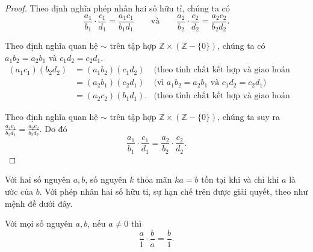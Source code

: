 \begin{proof}
	Theo định nghĩa phép nhân hai số hữu tỉ, chúng ta có
	\[
		\frac{a_{1}}{b_{1}}\cdot\frac{c_{1}}{d_{1}} = \frac{a_{1}c_{1}}{b_{1}d_{1}}\qquad\text{và}\qquad\frac{a_{2}}{b_{2}}\cdot\frac{c_{2}}{d_{2}} = \frac{a_{2}c_{2}}{b_{2}d_{2}}.
	\]

	Theo định nghĩa quan hệ $\sim$ trên tập hợp $\mathbb{Z}\times(\mathbb{Z} - \{0\})$, chúng ta có $a_{1}b_{2} = a_{2}b_{1}$ và $c_{1}d_{2} = c_{2}d_{1}$.
	\begin{align*}
		(a_{1}c_{1})(b_{2}d_{2}) & = (a_{1}b_{2})(c_{1}d_{2})  & \text{(theo tính chất kết hợp và giao hoán của phép nhân số nguyên)} \\
		                         & = (a_{2}b_{1})(c_{2}d_{1})  & \text{(vì $a_{1}b_{2} = a_{2}b_{1}$ và $c_{1}d_{2} = c_{2}d_{1}$)}   \\
		                         & = (a_{2}c_{2})(b_{1}d_{1}). & \text{(theo tính chất kết hợp và giao hoán của phép nhân số nguyên)}
	\end{align*}

	Theo định nghĩa quan hệ $\sim$ trên tập hợp $\mathbb{Z}\times(\mathbb{Z} - \{0\})$, chúng ta suy ra $\frac{a_{1}c_{1}}{b_{1}d_{1}} = \frac{a_{2}c_{2}}{b_{2}d_{2}}$. Do đó
	\[
		\frac{a_{1}}{b_{1}}\cdot\frac{c_{1}}{d_{1}} = \frac{a_{2}}{b_{2}}\cdot\frac{c_{2}}{d_{2}}.
	\]
\end{proof}

Với hai số nguyên $a, b$, số nguyên $k$ thỏa mãn $ka = b$ tồn tại khi và chỉ khi $a$ là ước của $b$. Với phép nhân hai số hữu tỉ, sự hạn chế trên được giải quyết, theo như mệnh đề dưới đây.
\begin{proposition}
	Với mọi số nguyên $a, b$, nếu $a\ne 0$ thì
	\[
		\frac{a}{1}\cdot\frac{b}{a} = \frac{b}{1}.
	\]
\end{proposition}

